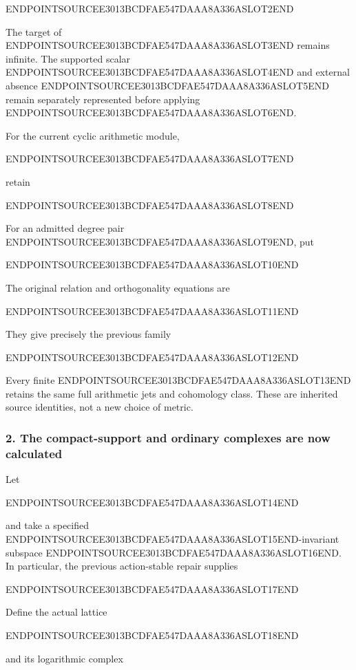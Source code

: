 ENDPOINTSOURCEE3013BCDFAE547DAAA8A336ASLOT2END

The target of ENDPOINTSOURCEE3013BCDFAE547DAAA8A336ASLOT3END remains infinite. The supported scalar ENDPOINTSOURCEE3013BCDFAE547DAAA8A336ASLOT4END and external absence ENDPOINTSOURCEE3013BCDFAE547DAAA8A336ASLOT5END remain separately represented before applying ENDPOINTSOURCEE3013BCDFAE547DAAA8A336ASLOT6END.

For the current cyclic arithmetic module,

ENDPOINTSOURCEE3013BCDFAE547DAAA8A336ASLOT7END

retain

ENDPOINTSOURCEE3013BCDFAE547DAAA8A336ASLOT8END

For an admitted degree pair ENDPOINTSOURCEE3013BCDFAE547DAAA8A336ASLOT9END, put

ENDPOINTSOURCEE3013BCDFAE547DAAA8A336ASLOT10END

The original relation and orthogonality equations are

ENDPOINTSOURCEE3013BCDFAE547DAAA8A336ASLOT11END

They give precisely the previous family

ENDPOINTSOURCEE3013BCDFAE547DAAA8A336ASLOT12END

Every finite ENDPOINTSOURCEE3013BCDFAE547DAAA8A336ASLOT13END retains the same full arithmetic jets and cohomology class. These are inherited source identities, not a new choice of metric.

\subsubsection{2. The compact-support and ordinary complexes are now calculated}\label{endpoint-exponential_constituent_original--the-compact-support-and-ordinary-complexes-are-now-calculated}

Let

ENDPOINTSOURCEE3013BCDFAE547DAAA8A336ASLOT14END

and take a specified ENDPOINTSOURCEE3013BCDFAE547DAAA8A336ASLOT15END-invariant subspace ENDPOINTSOURCEE3013BCDFAE547DAAA8A336ASLOT16END. In particular, the previous action-stable repair supplies

ENDPOINTSOURCEE3013BCDFAE547DAAA8A336ASLOT17END

Define the actual lattice

ENDPOINTSOURCEE3013BCDFAE547DAAA8A336ASLOT18END

and its logarithmic complex

